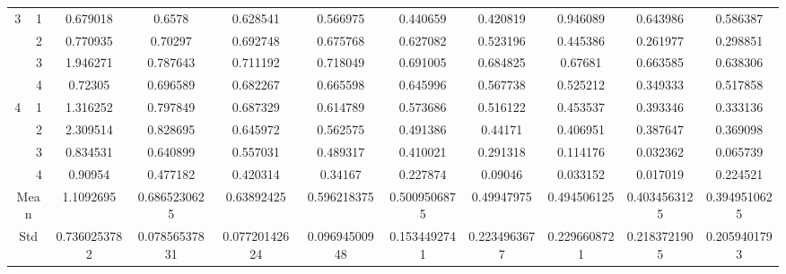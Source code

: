\documentclass[draft,dvipsnames]{drexel-thesis}
\begin{document}
\begin{thesis}
\begin{table}[!t]
{\begin{tabular}{|c|c|c|c|c|c|c|c|c|c|c|}
\multirow{4}{*}{3}    & 1                   & 0.679018     & 0.6578        & 0.628541      & 0.566975      & 0.440659     & 0.420819     & 0.946089     & 0.643986     & 0.586387     \\ \cline{2-11} 
                      & 2                   & 0.770935     & 0.70297       & 0.692748      & 0.675768      & 0.627082     & 0.523196     & 0.445386     & 0.261977     & 0.298851     \\ \cline{2-11} 
                      & 3                   & 1.946271     & 0.787643      & 0.711192      & 0.718049      & 0.691005     & 0.684825     & 0.67681      & 0.663585     & 0.638306     \\ \cline{2-11} 
                      & 4                   & 0.72305      & 0.696589      & 0.682267      & 0.665598      & 0.645996     & 0.567738     & 0.525212     & 0.349333     & 0.517858     \\ \hline
\multirow{4}{*}{4}    & 1                   & 1.316252     & 0.797849      & 0.687329      & 0.614789      & 0.573686     & 0.516122     & 0.453537     & 0.393346     & 0.333136     \\ \cline{2-11} 
                      & 2                   & 2.309514     & 0.828695      & 0.645972      & 0.562575      & 0.491386     & 0.44171      & 0.406951     & 0.387647     & 0.369098     \\ \cline{2-11} 
                      & 3                   & 0.834531     & 0.640899      & 0.557031      & 0.489317      & 0.410021     & 0.291318     & 0.114176     & 0.032362     & 0.065739     \\ \cline{2-11} 
                      & 4                   & 0.90954      & 0.477182      & 0.420314      & 0.34167       & 0.227874     & 0.09046      & 0.033152     & 0.017019     & 0.224521     \\ \hline
\multicolumn{2}{|c|}{Mean}                  & 1.1092695    & 0.6865230625  & 0.63892425    & 0.596218375   & 0.5009506875 & 0.49947975   & 0.494506125  & 0.4034563125 & 0.3949510625 \\ \hline
\multicolumn{2}{|c|}{Std}                   & 0.7360253782 & 0.07856537831 & 0.07720142624 & 0.09694500948 & 0.1534492741 & 0.2234963677 & 0.2296608721 & 0.2183721905 & 0.2059401793 \\ \hline
\end{tabular}}
\end{table}


\end{thesis}
\end{document}
